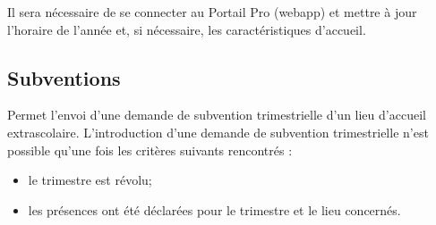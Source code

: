 Il sera nécessaire de se connecter au Portail Pro (webapp) et mettre à jour l'horaire de l'année et, si nécessaire, les caractéristiques d'accueil.



\subsection{Subventions}
Permet l'envoi d'une demande de subvention trimestrielle d'un lieu d'accueil extrascolaire. L'introduction d'une demande de subvention trimestrielle n’est possible qu’une fois les critères suivants rencontrés :

\begin{itemize}
    \item le trimestre est révolu;
    \item les présences ont été déclarées pour le trimestre et le lieu concernés.
\end{itemize}






